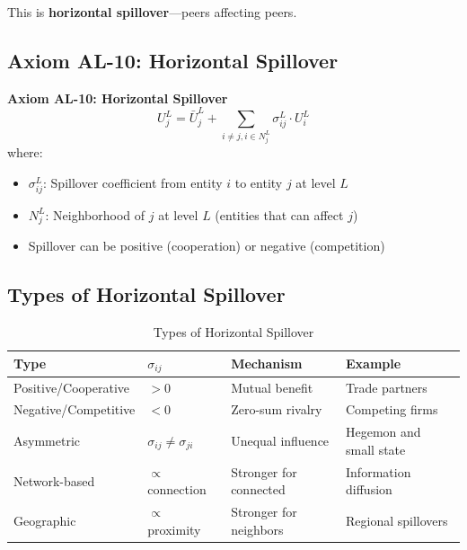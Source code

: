 This is \textbf{horizontal spillover}---peers affecting peers.

\subsection{Axiom AL-10: Horizontal Spillover}

\begin{tcolorbox}[colback=gray!5!white, colframe=gray!75!black]
\textbf{Axiom AL-10: Horizontal Spillover}
\begin{equation}
\boxed{
U^L_j = \bar{U}^L_j + \sum_{i \neq j, i \in N^L_j} \sigma^L_{ij} \cdot U^L_i
}
\end{equation}
where:
\begin{itemize}
\item $\sigma^L_{ij}$: Spillover coefficient from entity $i$ to entity $j$ at level $L$
\item $N^L_j$: Neighborhood of $j$ at level $L$ (entities that can affect $j$)
\item Spillover can be positive (cooperation) or negative (competition)
\end{itemize}
\end{tcolorbox}

\subsection{Types of Horizontal Spillover}

\begin{table}[htbp]
\centering
\caption{Types of Horizontal Spillover}
\label{tab:aaa-spillover-types}
\renewcommand{\arraystretch}{1.3}
\begin{tabular}{@{}llll@{}}
\toprule
\textbf{Type} & \textbf{$\sigma_{ij}$} & \textbf{Mechanism} & \textbf{Example} \\
\midrule
Positive/Cooperative & $> 0$ & Mutual benefit & Trade partners \\
Negative/Competitive & $< 0$ & Zero-sum rivalry & Competing firms \\
Asymmetric & $\sigma_{ij} \neq \sigma_{ji}$ & Unequal influence & Hegemon and small state \\
Network-based & $\propto$ connection & Stronger for connected & Information diffusion \\
Geographic & $\propto$ proximity & Stronger for neighbors & Regional spillovers \\
\bottomrule
\end{tabular}
\end{table}

